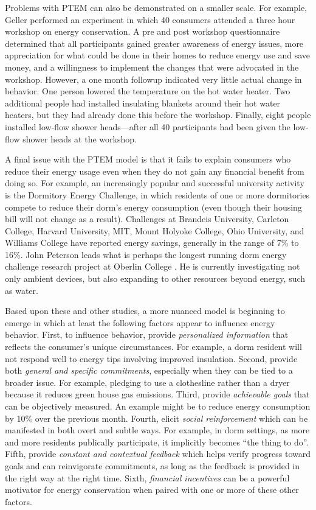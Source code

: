 Problems with PTEM can also be demonstrated on a smaller scale.  For
example, Geller \cite{Geller81} performed an experiment in which 40
consumers attended a three hour workshop on energy conservation.  A pre and
post workshop questionnaire determined that all participants gained greater
awareness of energy issues, more appreciation for what could be done in
their homes to reduce energy use and save money, and a willingness to
implement the changes that were advocated in the workshop. However, a one
month followup indicated very little actual change in behavior. One person
lowered the temperature on the hot water heater. Two additional people had
installed insulating blankets around their hot water heaters, but they had
already done this before the workshop. Finally, eight people installed
low-flow shower heads---after all 40 participants had been given the
low-flow shower heads at the workshop.

A final issue with the PTEM model is that it fails to explain consumers who
reduce their energy usage even when they do not gain any financial benefit
from doing so.  For example, an increasingly popular and successful
university activity is the Dormitory Energy Challenge, in which residents
of one or more dormitories compete to reduce their dorm's energy
consumption (even though their housing bill will not change as a result).
Challenges at Brandeis University, Carleton College, Harvard University,
MIT, Mount Holyoke College, Ohio University, and Williams College have
reported energy savings, generally in the range of 7\% to 16\%.  John
Peterson leads what is perhaps the longest running dorm energy challenge
research project at Oberlin College \cite{Peterson07,Peterson07a}.  He is
currently investigating not only ambient devices, but also expanding to
other resources beyond energy, such as water.

Based upon these and other studies, a more nuanced model is beginning to
emerge in which at least the following factors appear to influence energy
behavior.  First, to influence behavior, provide {\em personalized
  information} that reflects the consumer's unique circumstances.  For
example, a dorm resident will not respond well to energy tips involving
improved insulation.  Second, provide both {\em general and specific
  commitments}, especially when they can be tied to a broader issue. For
example, pledging to use a clothesline rather than a dryer because it
reduces green house gas emissions.  Third, provide {\em achievable goals}
that can be objectively measured.  An example might be to reduce energy
consumption by 10\% over the previous month.  Fourth, elicit {\em social
  reinforcement} which can be manifested in both overt and subtle ways.  For
example, in dorm settings, as more and more residents publically
participate, it implicitly becomes ``the thing to do''.  Fifth, provide
{\em constant and contextual feedback} which helps verify progress toward
goals and can reinvigorate commitments, as long as the feedback is provided
in the right way at the right time.  Sixth, {\em financial incentives} can
be a powerful motivator for energy conservation when paired with one or
more of these other factors.


